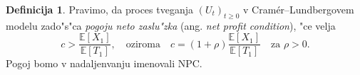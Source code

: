 \documentclass[12pt, a4paper, reqno]{amsart}
\theoremstyle{definition}
\newtheorem{definicija}{Definicija}[section]
\theoremstyle{plain}
\newcommand{\N}{\mathbb{N}}
\newcommand{\E}{\mathbb{E}}
\newcommand{\Prob}{\mathbb{P}}
\newcommand{\1}{\mathds{1}}
\begin{document}
%
%
%

        \begin{definicija}
            Pravimo, da proces tveganja $(U_t)_{t\geq0}$ v Cramér--Lundbergovem modelu
             zado"s"ca \textit{pogoju neto zaslu"zka} (ang. \textit{net profit condition}), "ce velja 
            \begin{equation*}
                c > \frac{\E\left[X_1\right]}{\E\left[T_1\right]}, \quad \text{oziroma} \quad 
                c = (1 + \rho)\frac{\E\left[X_1\right]}{\E\left[T_1\right]} \quad \text{za $\rho > 0$}.
            \end{equation*}
            Pogoj bomo v nadaljenvanju imenovali NPC.
            \label{def:NPC}
        \end{definicija}
\end{document}
